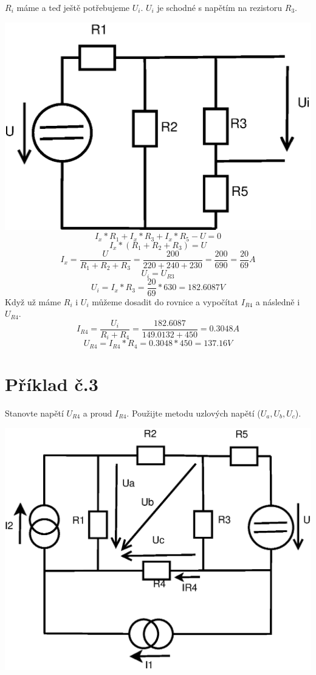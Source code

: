 \documentclass[a4paper, 12pt]{article}
\begin{document}
\newpage

$R_i$ máme a teď ještě potřebujeme $U_i$. $U_i$ je schodné s napětím na rezistoru $R_3$.  

\includegraphics[scale=0.5]{pr2/bb_4.eps}
\vspace{1mm}
$$ I_x * R_1 + I_x * R_3 + I_x * R_5 - U = 0 $$
$$ I_x*(R_1 + R_2 + R_3) = U $$
$$ I_x = \frac{U}{R_1 + R_2 + R_3} = \frac{200}{220+240+230} = \frac{200}{690} = \frac{20}{69} A$$
\vspace{3mm}
$$ U_i = U_{R3} $$
\vspace{1mm}
$$ U_i = I_x * R_3 = \frac{20}{69} * 630 = 182.6087 V $$
\vspace{3mm}
Když už máme $R_i$ i $U_i$ můžeme dosadit do rovnice a vypočítat $I_{R4}$ a následně i $U_{R4}$.
$$ I_{R4} = \frac{U_i}{R_i+R_4} = \frac{182.6087}{149.0132 + 450} = 0.3048 A $$
\vspace{1mm}
$$ U_{R4} = I_{R4} * R_4 = 0.3048 * 450 = 137.16 V $$


\newpage
\section{Příklad č.3}

Stanovte napětí $U_{R4}$ a proud $I_{R4}$. Použijte metodu uzlových napětí ($U_a, U_b, U_c$).

\includegraphics[scale=0.5]{pr3/cc_01.eps}
\end{document}
